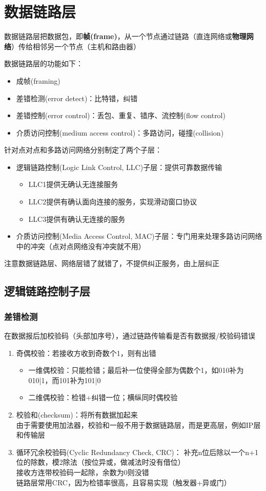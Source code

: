 
\section{数据链路层}
数据链路层把数据包，即\textbf{帧(frame)}，从一个节点通过链路（直连网络或\textbf{物理网络}）传给相邻另一个节点（主机和路由器）

数据链路层的功能如下：
\begin{itemize}
	\item 成帧(framing)
	\item 差错检测(error detect)：比特错，纠错
	\item 差错控制(error control)：丢包、重复、错序、流控制(flow control)
	\item 介质访问控制(medium access control)：多路访问，碰撞(collision)
\end{itemize}

针对点对点和多路访问网络分别制定了两个子层：
\begin{itemize}
	\item 逻辑链路控制(Logic Link Control, LLC)子层：提供可靠数据传输
	\begin{itemize}
		\item LLC1提供无确认无连接服务
		\item LLC2提供有确认面向连接的服务，实现滑动窗口协议
		\item LLC3提供有确认无连接的服务
	\end{itemize}
	\item 介质访问控制(Media Access Control, MAC)子层：专门用来处理多路访问网络中的冲突（点对点网络没有冲突就不用）
\end{itemize}
注意数据链路层、网络层错了就错了，不提供纠正服务，由上层纠正

\subsection{逻辑链路控制子层}
\subsubsection{差错检测}
在数据报后加校验码（头部加序号），通过链路传输看是否有数据报/校验码错误
\begin{enumerate}
\item 奇偶校验：若接收方收到奇数个1，则有出错
\begin{itemize}
	\item 一维偶校验：只能检错；最后补一位使得全部为偶数个1，如010补为010|1，而101补为101|0
	\item 二维偶校验：检错+纠错一位；横纵同时偶校验
\end{itemize}
\item 校验和(checksum)：将所有数据加起来\\
由于需要使用加法器，校验和一般不用于数据链路层，而是更高层，例如IP层和传输层
\item 循环冗余校验码(Cyclic Redundancy Check, CRC)：
补充n位后除以一个n+1位的除数，模2除法（按位异或，做减法时没有借位）\\
接收方连带校验码一起除，余数为0则没错\\
链路层常用CRC，因为检错率很高，且容易实现（触发器+异或门）
\end{enumerate}

